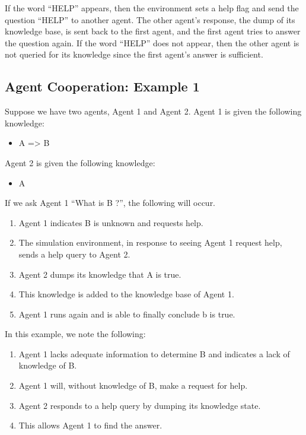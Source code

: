 \documentclass{article}
\begin{document}
If the word “HELP” appears, then the environment sets a help flag and send the question “HELP” to another agent. The other agent’s response, the dump of its knowledge base, is sent back to the first agent, and the first agent tries to answer the question again. If the word “HELP” does not appear, then the other agent is not queried for its knowledge since the first agent’s answer is sufficient.

\subsection{Agent Cooperation: Example 1}
\label{example_1}

Suppose we have two agents, Agent 1 and Agent 2. Agent 1 is given the following knowledge:

\begin{itemize}
	\item A => B
\end{itemize}

Agent 2 is given the following knowledge:

\begin{itemize}
	\item A
\end{itemize}

If we ask Agent 1 “What is B ?”, the following will occur.

\begin{enumerate}
	\item Agent 1 indicates B is unknown and requests help.
	\item The simulation environment, in response to seeing Agent 1 request help, sends a help query to Agent 2.
	\item Agent 2 dumps its knowledge that A is true.
	\item This knowledge is added to the knowledge base of Agent 1.
	\item Agent 1 runs again and is able to finally conclude b is true.
\end{enumerate}

In this example, we note the following:

\begin{enumerate}
	\item Agent 1 lacks adequate information to determine B and indicates a lack of knowledge of B.
	\item Agent 1 will, without knowledge of B, make a request for help.
	\item Agent 2 responds to a help query by dumping its knowledge state.
	\item This allows Agent 1 to find the answer.
\end{enumerate}
\end{document}
